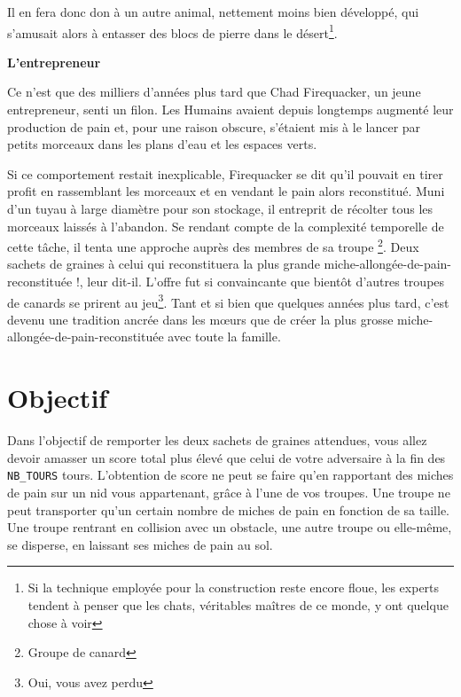 Il en fera donc don à un autre animal, nettement moins bien développé,
qui s'amusait alors à entasser des blocs de pierre dans le désert\footnote{Si
la technique employée pour la construction reste encore floue, les experts
\footnotemark
tendent à penser que les chats, véritables maîtres de ce monde, y ont quelque
chose à voir}.

\textbf{\large L'entrepreneur}

Ce n'est que des milliers d'années plus tard que Chad Firequacker, un
jeune entrepreneur, senti un filon. Les Humains avaient depuis longtemps
augmenté leur production de pain et, pour une raison obscure, s'étaient mis
à le lancer par petits morceaux dans les plans d'eau et les espaces verts.

Si ce comportement restait inexplicable, Firequacker se dit qu'il pouvait en
tirer profit en rassemblant les morceaux et en vendant le pain alors reconstitué.
Muni d'un tuyau à large diamètre pour son stockage, il entreprit de récolter
tous les morceaux laissés à l'abandon. Se rendant compte de la complexité
temporelle de cette tâche, il tenta une approche auprès des membres de sa troupe
\footnote{Groupe de canard}.
\og Deux sachets de graines à celui qui reconstituera la plus grande
miche-allongée-de-pain-reconstituée !\fg, leur dit-il. L'offre fut si convaincante
que bientôt d'autres troupes de canards se prirent au jeu\footnote{Oui, vous avez perdu}. Tant et si bien que
quelques années plus tard, c'est devenu une tradition ancrée dans les mœurs que de
créer la plus grosse miche-allongée-de-pain-reconstituée avec toute la famille.










\section{Objectif}

Dans l'objectif de remporter les deux sachets de graines attendues,
vous allez devoir amasser un score total plus
élevé que celui de votre adversaire à la fin des \texttt{NB\_TOURS}
tours. L'obtention de score ne peut se faire qu'en rapportant des
miches de pain sur un nid vous appartenant, grâce à l'une de vos
troupes. Une troupe ne peut transporter qu'un certain nombre de
miches de pain en fonction de sa taille. Une troupe rentrant en
collision avec un obstacle, une autre troupe ou elle-même, se disperse,
en laissant ses miches de pain au sol.

